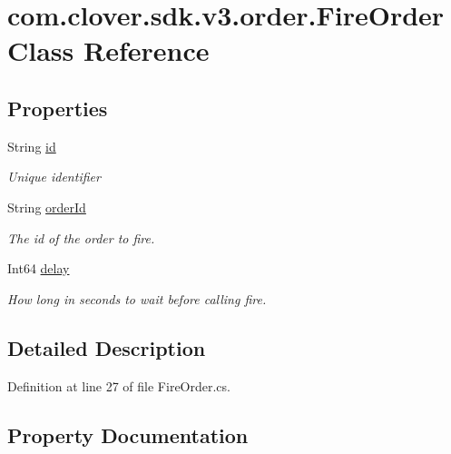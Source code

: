 \hypertarget{classcom_1_1clover_1_1sdk_1_1v3_1_1order_1_1_fire_order}{}\section{com.\+clover.\+sdk.\+v3.\+order.\+Fire\+Order Class Reference}
\label{classcom_1_1clover_1_1sdk_1_1v3_1_1order_1_1_fire_order}
\subsection*{Properties}
\begin{DoxyCompactItemize}
\item 
String \hyperlink{classcom_1_1clover_1_1sdk_1_1v3_1_1order_1_1_fire_order_a67ccc9bed5206192b4da536dfbc4595f}{id}
\begin{DoxyCompactList}\small\item\em Unique identifier \end{DoxyCompactList}\item 
String \hyperlink{classcom_1_1clover_1_1sdk_1_1v3_1_1order_1_1_fire_order_a99284e04888e31790949f4ede72eb805}{order\+Id}
\begin{DoxyCompactList}\small\item\em The id of the order to fire. \end{DoxyCompactList}\item 
Int64 \hyperlink{classcom_1_1clover_1_1sdk_1_1v3_1_1order_1_1_fire_order_a375094a9e2b7281fd66b50bb72d57544}{delay}
\begin{DoxyCompactList}\small\item\em How long in seconds to wait before calling fire. \end{DoxyCompactList}\end{DoxyCompactItemize}


\subsection{Detailed Description}


Definition at line 27 of file Fire\+Order.\+cs.



\subsection{Property Documentation}
\mbox{\label{classcom_1_1clover_1_1sdk_1_1v3_1_1order_1_1_fire_order_a375094a9e2b7281fd66b50bb72d57544}} 

